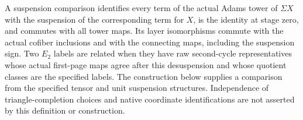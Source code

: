 \begin{definition}
  \label{def:mahowald-tower-suspension-comparison}
  \leanok
  A suspension comparison identifies every term of the actual Adams tower
  of $\Sigma X$ with the suspension of the corresponding term for $X$,
  is the identity at stage zero, and commutes with all tower maps. Its
  layer isomorphisms commute with the actual cofiber inclusions and with
  the connecting maps, including the suspension sign. Two $E_2$ labels
  are related when they have raw second-cycle representatives whose
  actual first-page maps agree after this desuspension and whose quotient
  classes are the specified labels. The construction below supplies a
  comparison from the specified tensor and unit suspension structures.
  Independence of triangle-completion choices and native coordinate
  identifications are not asserted by this definition or construction.
\end{definition}

